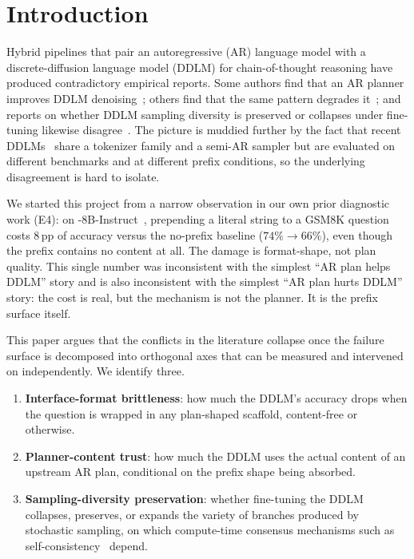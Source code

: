 \section{Introduction}
\label{sec:introduction}

Hybrid pipelines that pair an autoregressive (AR) language model with
a discrete-diffusion language model (DDLM) for chain-of-thought
reasoning have produced contradictory empirical reports.  Some
authors find that an AR planner improves DDLM
denoising~\citep{ye2024diffusionofthought,zhao2025d1};
others find that the same pattern degrades it~\citep{huang2025dcolt};
and reports on whether DDLM sampling diversity is preserved or
collapses under fine-tuning likewise disagree~\citep{liu2025ccdd}.
The picture is muddied further by the fact that recent
DDLMs~\citep{nie2025llada,gong2024diffullama,arriola2025bd3lms} share
a tokenizer family and a semi-AR sampler but are evaluated on
different benchmarks and at different prefix conditions, so the
underlying disagreement is hard to isolate.

We started this project from a narrow observation in our own prior
diagnostic work (E4): on \LLaDA{}-8B-Instruct~\citep{nie2025llada},
prepending a literal  string to a GSM8K
question~\citep{cobbe2021gsm8k} costs $8$\,pp of accuracy versus the
no-prefix baseline ($74\% \rightarrow 66\%$), even though the prefix
contains no content at all.  The damage is format-shape, not plan
quality.  This single number was inconsistent with the simplest
``AR plan helps DDLM'' story and is also inconsistent with the
simplest ``AR plan hurts DDLM'' story: the cost is real, but the
mechanism is not the planner.  It is the prefix surface itself.

This paper argues that the conflicts in the literature collapse once
the failure surface is decomposed into orthogonal axes that can be
measured and intervened on independently.  We identify three.

\begin{enumerate}
    \item \textbf{Interface-format brittleness}: how much the DDLM's
          accuracy drops when the question is wrapped in any
          plan-shaped scaffold, content-free or otherwise.
    \item \textbf{Planner-content trust}: how much the DDLM uses the
          actual content of an upstream AR plan, conditional on the
          prefix shape being absorbed.
    \item \textbf{Sampling-diversity preservation}: whether
          fine-tuning the DDLM collapses, preserves, or expands the
          variety of branches produced by stochastic sampling, on
          which compute-time consensus mechanisms such as
          self-consistency~\citep{wang2023selfconsistency} depend.
\end{enumerate}

